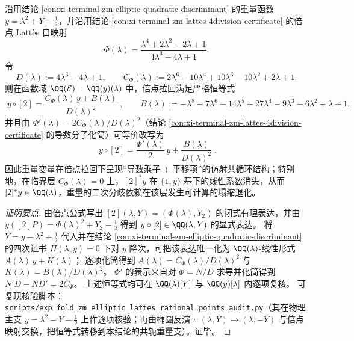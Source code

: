 \begin{conclusion}\label{con:xi-terminal-zm-elliptic-y-doubling-affine-cocycle}
沿用结论 \ref{con:xi-terminal-zm-elliptic-quadratic-discriminant} 的重量函数 \(y=\lambda^{2}+Y-\tfrac12\)，并沿用结论 \ref{con:xi-terminal-zm-lattes-4division-certificate} 的倍点 Latt\`es 自映射
\[
\Phi(\lambda)=\frac{\lambda^{4}+2\lambda^{2}-2\lambda+1}{4\lambda^{3}-4\lambda+1}.
\]
令
\[
D(\lambda):=4\lambda^{3}-4\lambda+1,\qquad
C_{\Phi}(\lambda):=2\lambda^{6}-10\lambda^{4}+10\lambda^{3}-10\lambda^{2}+2\lambda+1.
\]
则在函数域 \(\QQ(\mathcal{E})=\QQ(y)(\lambda)\) 中，倍点拉回满足严格恒等式
\[
\boxed{\;
y\circ[2]=\frac{C_{\Phi}(\lambda)\,y+B(\lambda)}{D(\lambda)^{2}}\;},
\qquad
B(\lambda):=-\lambda^{8}+7\lambda^{6}-14\lambda^{5}+27\lambda^{4}-9\lambda^{3}-6\lambda^{2}+\lambda+1.
\]
并且由 \(\Phi'(\lambda)=2C_{\Phi}(\lambda)/D(\lambda)^{2}\)（结论 \ref{con:xi-terminal-zm-lattes-4division-certificate} 的导数分子化简）可等价改写为
\[
\boxed{\;
y\circ[2]=\frac{\Phi'(\lambda)}{2}\,y+\frac{B(\lambda)}{D(\lambda)^{2}}\; }.
\]
因此重量变量在倍点拉回下呈现“导数乘子 + 平移项”的仿射共循环结构；特别地，在临界层 \(C_{\Phi}(\lambda)=0\) 上，\([2]^*y\) 在 \(\{1,y\}\) 基下的线性系数消失，从而 \([2]^*y\in\QQ(\lambda)\)，重量的二次分歧依赖在该层发生可计算的塌缩退化。
\end{conclusion}
\begin{proof}[证明要点]
由倍点公式写出 \([2](\lambda,Y)=(\Phi(\lambda),Y_2)\) 的闭式有理表达，并由
\(
y([2]P)=\Phi(\lambda)^{2}+Y_2-\tfrac12
\)
得到 \(y\circ[2]\in\QQ(\lambda,Y)\) 的显式表达。
将 \(Y=y-\lambda^{2}+\tfrac12\) 代入并在结论 \ref{con:xi-terminal-zm-elliptic-quadratic-discriminant} 的四次证书 \(\Pi(\lambda,y)=0\) 下对 \(y\) 降次，可把该表达唯一化为 \(\QQ(\lambda)\)-线性形式 \(A(\lambda)\,y+K(\lambda)\)；
逐项化简得到 \(A(\lambda)=C_{\Phi}(\lambda)/D(\lambda)^{2}\) 与 \(K(\lambda)=B(\lambda)/D(\lambda)^{2}\)。
\(\Phi'\) 的表示来自对 \(\Phi=N/D\) 求导并化简得到 \(N'D-ND'=2C_{\Phi}\)。
上述恒等式均可在 \(\QQ(\lambda)[Y]\) 与 \(\QQ(y)[\lambda]\) 内逐项复核。
可复现核验脚本：\texttt{scripts/exp\_fold\_zm\_elliptic\_lattes\_rational\_points\_audit.py}（其在物理主支 \(y=\lambda^{2}-Y-\tfrac12\) 上作逐项核验；再由椭圆反演 \(\iota:(\lambda,Y)\mapsto(\lambda,-Y)\) 与倍点映射交换，把恒等式转移到本结论的共轭重量支）。证毕。
\end{proof}

